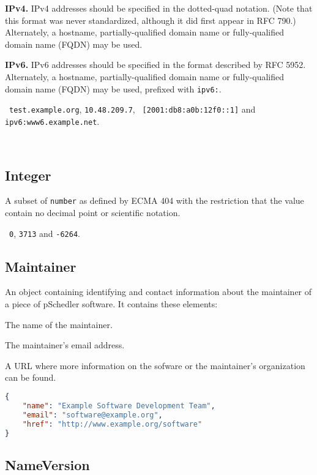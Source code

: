 \documentclass[10pt]{article}
\begin{document}
{\bf IPv4.}  IPv4 addresses should be specified in the dotted-quad
notation.  (Note that this format was never standardized, although it
did first appear in RFC 790.)  Alternately, a hostname,
partially-qualified domain name or fully-qualified domain name (FQDN)
may be used.

{\bf IPv6.}  IPv6 addresses should be specified in the format
described by RFC 5952.  Alternately, a hostname, partially-qualified
domain name or fully-qualified domain name (FQDN) may be used,
prefixed with {\tt ipv6:}.  

\example\ {\tt test.example.org}, {\tt 10.48.209.7}, {\tt
  [2001:db8:a0b:12f0::1]} and {\tt ipv6:www6.example.net}.

\\


\subsection{Integer}
A subset of {\tt number} as defined by ECMA 404 with the restriction
that the value contain no decimal point or scientific notation.

\example\ {\tt 0}, {\tt 3713} and {\tt -6264}.


\subsection{Maintainer}

An object containing identifying and contact information about the
maintainer of a piece of pSchedler software.  It contains these
elements:

 The name of the maintainer.

 The maintainer's email address.

 A URL where more information on the sofware or
the maintainer's organization can be found.

\example
\begin{lstlisting}[language=json]
{
    "name": "Example Software Development Team",
    "email": "software@example.org",
    "href": "http://www.example.org/software"
}
\end{lstlisting}



\subsection{NameVersion}
\end{document}
